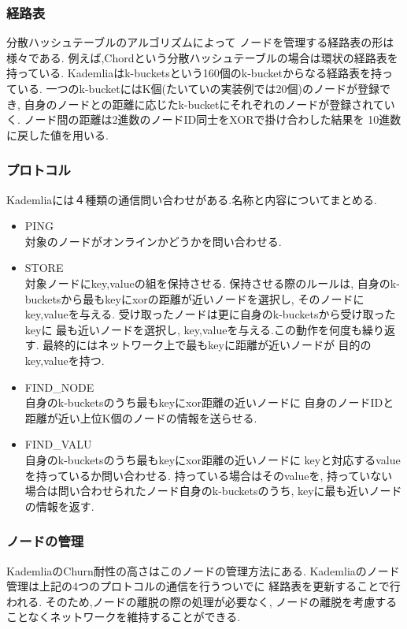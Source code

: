 \documentclass[sotsuron]{jcsie}
\begin{document}
\subsubsection{経路表}
分散ハッシュテーブルのアルゴリズムによって
ノードを管理する経路表の形は様々である.
例えば,Chordという分散ハッシュテーブルの場合は環状の経路表を持っている.
Kademliaはk-bucketsという160個のk-bucketからなる経路表を持っている.
一つのk-bucketにはK個(たいていの実装例では20個)のノードが登録でき,
自身のノードとの距離に応じたk-bucketにそれぞれのノードが登録されていく.
ノード間の距離は2進数のノードID同士をXORで掛け合わした結果を
10進数に戻した値を用いる.
\subsubsection{プロトコル}
Kademliaには４種類の通信問い合わせがある.名称と内容についてまとめる.
\begin{itemize}
	\item {PING}\\
	      対象のノードがオンラインかどうかを問い合わせる.\\
	\item {STORE}\\
	      対象ノードにkey,valueの組を保持させる.
	      保持させる際のルールは,
	      自身のk-bucketsから最もkeyにxorの距離が近いノードを選択し,
	      そのノードにkey,valueを与える.
	      受け取ったノードは更に自身のk-bucketsから受け取ったkeyに
	      最も近いノードを選択し,
	      key,valueを与える.この動作を何度も繰り返す.
	      最終的にはネットワーク上で最もkeyに距離が近いノードが
	      目的のkey,valueを持つ.\\	      
	\item {FIND\_NODE}\\
	      自身のk-bucketsのうち最もkeyにxor距離の近いノードに
	      自身のノードIDと距離が近い上位K個のノードの情報を送らせる.\\	      
	\item {FIND\_VALU}\\
	      自身のk-bucketsのうち最もkeyにxor距離の近いノードに
	      keyと対応するvalueを持っているか問い合わせる.
	      持っている場合はそのvalueを,
	      持っていない場合は問い合わせられたノード自身のk-bucketsのうち,
	      keyに最も近いノードの情報を返す.\\
\end{itemize}

\subsubsection{ノードの管理}
KademliaのChurn耐性の高さはこのノードの管理方法にある.
Kademliaのノード管理は上記の4つのプロトコルの通信を行うついでに
経路表を更新することで行われる.
そのため,ノードの離脱の際の処理が必要なく,
ノードの離脱を考慮することなくネットワークを維持することができる.
\end{document}
